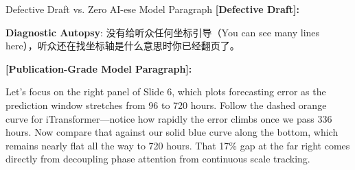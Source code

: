 \begin{ExampleBox}{Defective Draft vs. Zero AI-ese Model Paragraph}
\textbf{\color{TargetHighlight}[Defective Draft]:}\par
{}\par\vspace{4pt}
\textbf{Diagnostic Autopsy}: 没有给听众任何坐标引导（You can see many lines here），听众还在找坐标轴是什么意思时你已经翻页了。\par\vspace{6pt}
\textbf{\color{AcadNavy}[Publication-Grade Model Paragraph]:}\par
Let's focus on the right panel of Slide 6, which plots forecasting error as the prediction window stretches from 96 to 720 hours. Follow the dashed orange curve for iTransformer---notice how rapidly the error climbs once we pass 336 hours. Now compare that against our solid blue curve along the bottom, which remains nearly flat all the way to 720 hours. That 17\% gap at the far right comes directly from decoupling phase attention from continuous scale tracking.
\end{ExampleBox}
